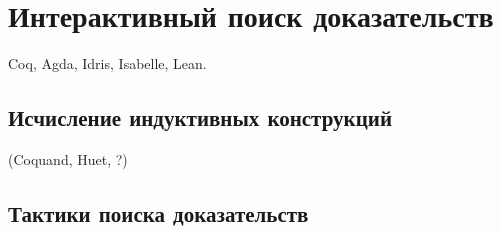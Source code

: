 \chapter{Интерактивный поиск доказательств}

Coq, Agda, Idris, Isabelle, Lean.

\section{Исчисление индуктивных конструкций}

(Coquand, Huet, ?)

\section{Тактики поиска доказательств}